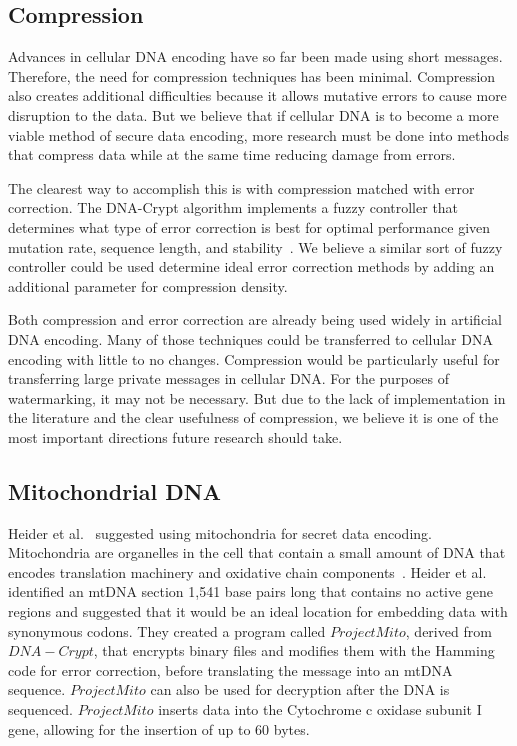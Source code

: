 \documentclass{bioinfo}
\begin{document}
\subsection{Compression}

Advances in cellular DNA encoding have so far been made using short messages. Therefore, the need for compression techniques has been minimal. Compression also creates additional difficulties because it allows mutative errors to cause more disruption to the data. But we believe that if cellular DNA is to become a more viable method of secure data encoding, more research must be done into methods that compress data while at the same time reducing damage from errors.

The clearest way to accomplish this is with compression matched with error correction. The DNA-Crypt algorithm implements a fuzzy controller that determines what type of error correction is best for optimal performance given mutation rate, sequence length, and stability~\cite{HBBMC2007}. We believe a similar sort of fuzzy controller could be used determine ideal error correction methods by adding an additional parameter for compression density.

Both compression and error correction are already being used widely in artificial DNA encoding. Many of those techniques could be transferred to cellular DNA encoding with little to no changes. Compression would be particularly useful for transferring large private messages in cellular DNA. For the purposes of watermarking, it may not be necessary. But due to the lack of implementation in the literature and the clear usefulness of compression, we believe it is one of the most important directions future research should take.

\subsection{Mitochondrial DNA}

Heider et al.~\cite{HKB2008B} suggested using mitochondria for secret data encoding. Mitochondria are organelles in the cell that contain a small amount of DNA that encodes translation machinery and oxidative chain components~\cite{GV2001G}. Heider et al. identified an mtDNA section 1,541 base pairs long that contains no active gene regions and suggested that it would be an ideal location for embedding data with synonymous codons. They created a program called $Project Mito$, derived from $DNA-Crypt$, that encrypts binary files and modifies them with the Hamming code for error correction, before translating the message into an mtDNA sequence. $Project Mito$ can also be used for decryption after the DNA is sequenced. $Project Mito$ inserts data into the Cytochrome c oxidase subunit I gene, allowing for the insertion of up to 60 bytes.
\end{document}
